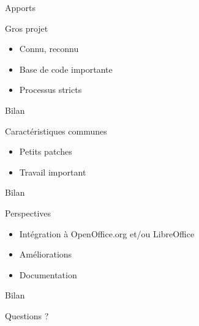 \documentclass[handout]{beamer}
\begin{document}
\begin{frame}{Apports}
    \begin{block}{Gros projet}
        \begin{itemize}[<+->]
            \item Connu, reconnu
            \item Base de code importante
            \item Processus stricts
        \end{itemize}
    \end{block}
\end{frame}

\begin{frame}{Bilan}
    \begin{block}{Caractéristiques communes}
        \begin{itemize}[<+->]
            \item Petits patches
            \item Travail important
        \end{itemize}
    \end{block}
\end{frame}

\begin{frame}{Bilan}
    \begin{block}{Perspectives}
        \begin{itemize}
            \item Intégration à OpenOffice.org et/ou LibreOffice
            \item Améliorations
            \item Documentation
        \end{itemize}
    \end{block}
\end{frame}

\begin{frame}{Bilan}
    \begin{block}{}
        \begin{center}
            Questions ?
        \end{center}
    \end{block}
\end{frame}
\end{document}
